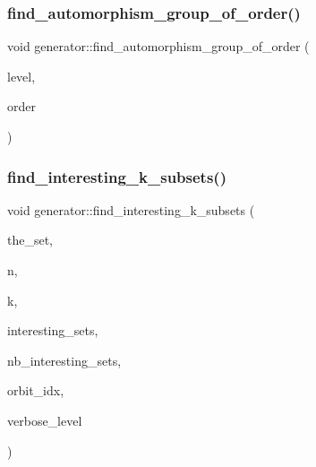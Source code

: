 \mbox{\label{classgenerator_a0e1112dc17485a838afe04b4d011a0df}} 
\subsubsection{\texorpdfstring{find\+\_\+automorphism\+\_\+group\+\_\+of\+\_\+order()}{find\_automorphism\_group\_of\_order()}}
{\footnotesize\ttfamily void generator\+::find\+\_\+automorphism\+\_\+group\+\_\+of\+\_\+order (\begin{DoxyParamCaption}\item[{\mbox{\hyperlink{galois_8h_a09fddde158a3a20bd2dcadb609de11dc}{I\+NT}}}]{level,  }\item[{\mbox{\hyperlink{galois_8h_a09fddde158a3a20bd2dcadb609de11dc}{I\+NT}}}]{order }\end{DoxyParamCaption})}

\mbox{\label{classgenerator_ad63e1393b6649d0832523c5398a92652}} 
\subsubsection{\texorpdfstring{find\+\_\+interesting\+\_\+k\+\_\+subsets()}{find\_interesting\_k\_subsets()}}
{\footnotesize\ttfamily void generator\+::find\+\_\+interesting\+\_\+k\+\_\+subsets (\begin{DoxyParamCaption}\item[{\mbox{\hyperlink{galois_8h_a09fddde158a3a20bd2dcadb609de11dc}{I\+NT}} $\ast$}]{the\+\_\+set,  }\item[{\mbox{\hyperlink{galois_8h_a09fddde158a3a20bd2dcadb609de11dc}{I\+NT}}}]{n,  }\item[{\mbox{\hyperlink{galois_8h_a09fddde158a3a20bd2dcadb609de11dc}{I\+NT}}}]{k,  }\item[{\mbox{\hyperlink{galois_8h_a09fddde158a3a20bd2dcadb609de11dc}{I\+NT}} $\ast$\&}]{interesting\+\_\+sets,  }\item[{\mbox{\hyperlink{galois_8h_a09fddde158a3a20bd2dcadb609de11dc}{I\+NT}} \&}]{nb\+\_\+interesting\+\_\+sets,  }\item[{\mbox{\hyperlink{galois_8h_a09fddde158a3a20bd2dcadb609de11dc}{I\+NT}} \&}]{orbit\+\_\+idx,  }\item[{\mbox{\hyperlink{galois_8h_a09fddde158a3a20bd2dcadb609de11dc}{I\+NT}}}]{verbose\+\_\+level }\end{DoxyParamCaption})}

